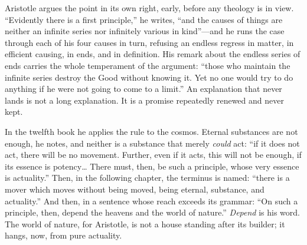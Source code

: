 Aristotle argues the point in its own right, early, before any theology is in view. ``Evidently there is a first principle,'' he writes, ``and the causes of things are neither an infinite series nor infinitely various in kind''---and he runs the case through each of his four causes in turn, refusing an endless regress in matter, in efficient causing, in ends, and in definition. His remark about the endless series of ends carries the whole temperament of the argument: ``those who maintain the infinite series destroy the Good without knowing it. Yet no one would try to do anything if he were not going to come to a limit.'' An explanation that never lands is not a long explanation. It is a promise repeatedly renewed and never kept.

In the twelfth book he applies the rule to the cosmos. Eternal substances are not enough, he notes, and neither is a substance that merely \emph{could} act: ``if it does not act, there will be no movement. Further, even if it acts, this will not be enough, if its essence is potency\ldots{} There must, then, be such a principle, whose very essence is actuality.'' Then, in the following chapter, the terminus is named: ``there is a mover which moves without being moved, being eternal, substance, and actuality.'' And then, in a sentence whose reach exceeds its grammar: ``On such a principle, then, depend the heavens and the world of nature.'' \emph{Depend} is his word. The world of nature, for Aristotle, is not a house standing after its builder; it hangs, now, from pure actuality.

